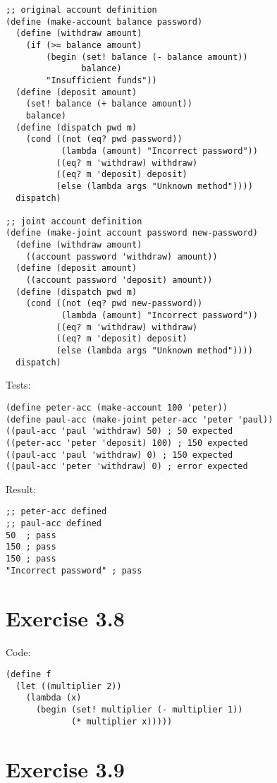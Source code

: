 \documentclass[../main.tex]{subfiles}
\begin{document}
\begin{lstlisting}
;; original account definition
(define (make-account balance password)
  (define (withdraw amount)
    (if (>= balance amount)
        (begin (set! balance (- balance amount))
               balance)
        "Insufficient funds"))
  (define (deposit amount)
    (set! balance (+ balance amount))
    balance)
  (define (dispatch pwd m)
    (cond ((not (eq? pwd password))
           (lambda (amount) "Incorrect password"))
          ((eq? m 'withdraw) withdraw)
          ((eq? m 'deposit) deposit)
          (else (lambda args "Unknown method"))))
  dispatch)

;; joint account definition
(define (make-joint account password new-password)
  (define (withdraw amount)
    ((account password 'withdraw) amount))
  (define (deposit amount)
    ((account password 'deposit) amount))
  (define (dispatch pwd m)
    (cond ((not (eq? pwd new-password))
           (lambda (amount) "Incorrect password"))
          ((eq? m 'withdraw) withdraw)
          ((eq? m 'deposit) deposit)
          (else (lambda args "Unknown method"))))
  dispatch)
\end{lstlisting}

Tests:

\begin{lstlisting}
(define peter-acc (make-account 100 'peter))
(define paul-acc (make-joint peter-acc 'peter 'paul))
((paul-acc 'paul 'withdraw) 50) ; 50 expected
((peter-acc 'peter 'deposit) 100) ; 150 expected
((paul-acc 'paul 'withdraw) 0) ; 150 expected
((paul-acc 'peter 'withdraw) 0) ; error expected
\end{lstlisting}

Result:

\begin{lstlisting}
;; peter-acc defined
;; paul-acc defined
50  ; pass
150 ; pass
150 ; pass
"Incorrect password" ; pass
\end{lstlisting}

\section{Exercise 3.8}

Code:

\begin{lstlisting}
(define f
  (let ((multiplier 2))
    (lambda (x)
      (begin (set! multiplier (- multiplier 1))
             (* multiplier x)))))
\end{lstlisting}

\section{Exercise 3.9}
\end{document}
